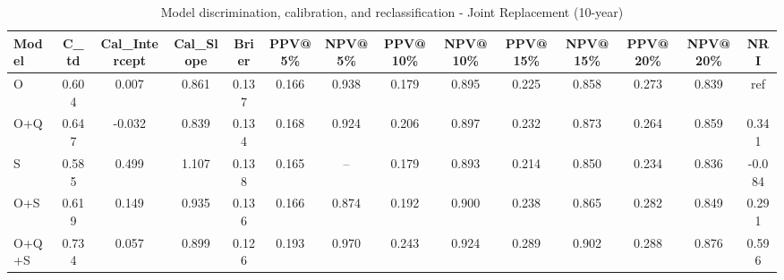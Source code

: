 \begin{table}[htbp]
\centering
\small
\caption{Model discrimination, calibration, and reclassification - Joint Replacement (10-year)}
\label{tab:perf_joint_10y}
\begin{tabular}{lccccccccccccc}
\toprule
Model & C\_td & Cal\_Intercept & Cal\_Slope & Brier & PPV@5\% & NPV@5\% & PPV@10\% & NPV@10\% & PPV@15\% & NPV@15\% & PPV@20\% & NPV@20\% & NRI \\
\midrule
O & 0.604 & 0.007 & 0.861 & 0.137 & 0.166 & 0.938 & 0.179 & 0.895 & 0.225 & 0.858 & 0.273 & 0.839 & ref \\
O+Q & 0.647 & -0.032 & 0.839 & 0.134 & 0.168 & 0.924 & 0.206 & 0.897 & 0.232 & 0.873 & 0.264 & 0.859 & 0.341 \\
S & 0.585 & 0.499 & 1.107 & 0.138 & 0.165 & -- & 0.179 & 0.893 & 0.214 & 0.850 & 0.234 & 0.836 & -0.084 \\
O+S & 0.619 & 0.149 & 0.935 & 0.136 & 0.166 & 0.874 & 0.192 & 0.900 & 0.238 & 0.865 & 0.282 & 0.849 & 0.291 \\
O+Q+S & 0.734 & 0.057 & 0.899 & 0.126 & 0.193 & 0.970 & 0.243 & 0.924 & 0.289 & 0.902 & 0.288 & 0.876 & 0.596 \\
\bottomrule
\end{tabular}
\end{table}